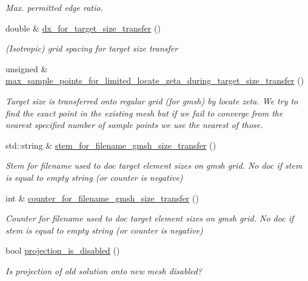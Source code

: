 \begin{DoxyCompactItemize}
\begin{DoxyCompactList}\small\item\em Max. permitted edge ratio. \end{DoxyCompactList}\item 
double \& \hyperlink{classoomph_1_1GmshParameters_ae5db3c2aca27f73ee53e32178255130d}{dx\+\_\+for\+\_\+target\+\_\+size\+\_\+transfer} ()
\begin{DoxyCompactList}\small\item\em (Isotropic) grid spacing for target size transfer \end{DoxyCompactList}\item 
unsigned \& \hyperlink{classoomph_1_1GmshParameters_a7b7dfff74a8e3183858ecd42b8f1a049}{max\+\_\+sample\+\_\+points\+\_\+for\+\_\+limited\+\_\+locate\+\_\+zeta\+\_\+during\+\_\+target\+\_\+size\+\_\+transfer} ()
\begin{DoxyCompactList}\small\item\em Target size is transferred onto regular grid (for gmsh) by locate zeta. We try to find the exact point in the existing mesh but if we fail to converge from the nearest specified number of sample points we use the nearest of those. \end{DoxyCompactList}\item 
std\+::string \& \hyperlink{classoomph_1_1GmshParameters_a6006bbce01fab0e48e474f077fc926e7}{stem\+\_\+for\+\_\+filename\+\_\+gmsh\+\_\+size\+\_\+transfer} ()
\begin{DoxyCompactList}\small\item\em Stem for filename used to doc target element sizes on gmsh grid. No doc if stem is equal to empty string (or counter is negative) \end{DoxyCompactList}\item 
int \& \hyperlink{classoomph_1_1GmshParameters_acf8155883aab25f0fc13c1eab7c03e9c}{counter\+\_\+for\+\_\+filename\+\_\+gmsh\+\_\+size\+\_\+transfer} ()
\begin{DoxyCompactList}\small\item\em Counter for filename used to doc target element sizes on gmsh grid. No doc if stem is equal to empty string (or counter is negative) \end{DoxyCompactList}\item 
bool \hyperlink{classoomph_1_1GmshParameters_ac8b37d79ebc135382c2320c3ba405a3f}{projection\+\_\+is\+\_\+disabled} ()
\begin{DoxyCompactList}\small\item\em Is projection of old solution onto new mesh disabled? \end{DoxyCompactList}\item 

\end{DoxyCompactItemize}
